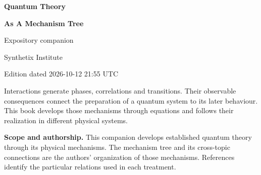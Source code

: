 \documentclass[11pt,oneside]{book}
\begin{document}
\frontmatter

\hypersetup{pageanchor=false}

\begin{titlepage}

\centering

\vspace*{1.7cm}

{\Huge\bfseries Quantum Theory\par}

\vspace{0.12cm}

{\Huge\bfseries As A Mechanism Tree\par}

\vspace{0.3cm}

{\large Expository companion\par}

\vspace{1.2cm}

{\large Synthetix Institute\par}

{\large Edition dated 2026-10-12 21:55 UTC\par}

\vfill

\begin{claimbox}

\noindent Interactions generate phases, correlations and transitions. Their observable consequences connect the preparation of a quantum system to its later behaviour. This book develops those mechanisms through equations and follows their realization in different physical systems.

\end{claimbox}

\vspace{0.5cm}

\begin{minipage}{0.94\linewidth}\small\raggedright

\textbf{Scope and authorship.} This companion develops established quantum theory through its physical mechanisms. The mechanism tree and its cross-topic connections are the authors' organization of those mechanisms. References identify the particular relations used in each treatment.

\end{minipage}

\end{titlepage}

\hypersetup{pageanchor=true}
\end{document}
